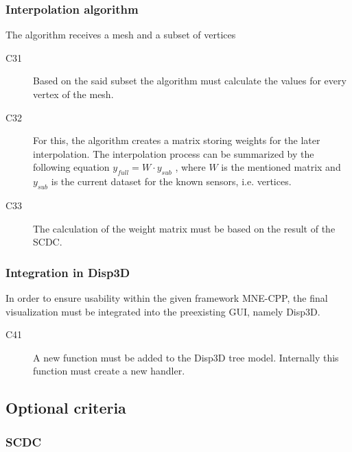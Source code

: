 \subsubsection{Interpolation algorithm}
The algorithm receives a mesh and a subset of vertices %
\begin{description}
	\item[C31] Based on the said subset the algorithm must calculate the values for every vertex of the mesh.
	
	\item[C32] For this, the algorithm creates a matrix storing weights for the later interpolation.
	The interpolation process can be summarized by the following equation $y_{full} = W \cdot y_{sub}$
	, where $W$ is the mentioned matrix and $y_{sub}$ is the current dataset for the known sensors, i.e. vertices.
	
	\item[C33] The calculation of the weight matrix must be based on the result of the SCDC.
	
	
	
\end{description}

\subsubsection{Integration in Disp3D}
	In order to ensure usability within the given framework MNE-CPP, the final visualization must be integrated into the preexisting GUI, namely Disp3D.
	
	\begin{description}
		\item[C41] A new function must be added to the Disp3D tree model. Internally this function must create a new handler.%
	\end{description}
	
	\subsection{Optional criteria}
	
	
	\subsubsection{SCDC}
	
